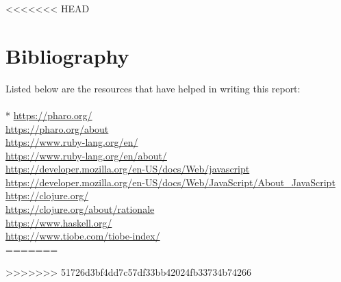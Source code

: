 <<<<<<< HEAD
\section*{Bibliography}
Listed below are the resources that have helped in writing this report:\\\\*
\url{https://pharo.org/}\\
\url{https://pharo.org/about}\\
\url{https://www.ruby-lang.org/en/}\\
\url{https://www.ruby-lang.org/en/about/}\\
\url{https://developer.mozilla.org/en-US/docs/Web/javascript}\\
\url{https://developer.mozilla.org/en-US/docs/Web/JavaScript/About_JavaScript}\\
\url{https://clojure.org/}\\
\url{https://clojure.org/about/rationale}\\
\url{https://www.haskell.org/}\\
\url{https://www.tiobe.com/tiobe-index/}\\
=======

>>>>>>> 51726d3bf4dd7c57df33bb42024fb33734b74266
